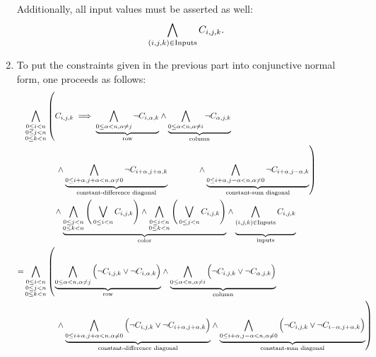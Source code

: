 \documentclass[journal,onecolumn]{IEEEtran}
\begin{document}
\begin{enumerate}
	Additionally, all input values must be asserted as well:
	\[
	\bigwedge_{(i, j, k) \in \textnormal{Inputs}} C_{i, j, k}.
	\]
	\item To put the constraints given in the previous part into conjunctive normal form, one proceeds as follows:
	\begin{align*}
	&\bigwedge_{\substack{0 \le i < n \\ 0 \le j < n \\ 0 \le k < n}} \left(C_{i, j, k} \implies {\underbrace{\bigwedge_{0 \le \alpha < n, \alpha \ne j} \lnot C_{i, \alpha, k}}_{\textnormal{row}}} \land {\underbrace{\bigwedge_{0 \le \alpha < n, \alpha \ne i} \lnot C_{\alpha, j, k}}_{\textnormal{column}}}\right. \\
	&\left. \qquad \qquad \! \! {} \land {\underbrace{\bigwedge_{0 \le i+\alpha, j+\alpha < n, \alpha \ne 0} \lnot C_{i+\alpha, j+\alpha, k}}_{\textnormal{constant-difference diagonal}}}  \qquad \qquad \! \! {} \land {\underbrace{\bigwedge_{0 \le i+\alpha, j-\alpha < n, \alpha \ne 0} \lnot C_{i+\alpha, j-\alpha, k}}_{\textnormal{constant-sum diagonal}}}\right) \\
	&\qquad \qquad \! \! {}  \land {\underbrace{\bigwedge_{\substack{0 \le j < n \\ 0 \le k < n}} \Bigg(\bigvee_{0 \le i < n} C_{i, j, k}\Bigg) \land \bigwedge_{\substack{0 \le i < n \\ 0 \le k < n}} \Bigg(\bigvee_{0 \le j < n} C_{i, j, k}\Bigg)}_{\textnormal{color}}} \land {\underbrace{\bigwedge_{(i, j, k) \in \textnormal{Inputs}} C_{i, j, k} \vphantom{\bigwedge_{\substack{0 \le j < n \\ 0 \le k < n}}}}_{\textnormal{inputs}}} \\
	=&\bigwedge_{\substack{0 \le i < n \\ 0 \le j < n \\ 0 \le k < n}} \left({\underbrace{\bigwedge_{0 \le \alpha < n, \alpha \ne j} \Big(\lnot C_{i, j, k} \lor \lnot C_{i, \alpha, k} \Big)}_{\textnormal{row}}} \land {\underbrace{\bigwedge_{0 \le \alpha < n, \alpha \ne i} \Big(\lnot C_{i, j, k} \lor \lnot C_{\alpha, j, k}\Big)}_{\textnormal{column}}} \right.\\
	&\left. \qquad \qquad \! \! {}  \land {\underbrace{\bigwedge_{0 \le i+\alpha, j+\alpha < n, \alpha \ne 0} \Big( \lnot C_{i, j, k} \lor \lnot C_{i + \alpha, j+\alpha, k}\Big)}_{\textnormal{constant-difference diagonal}}} \land {\underbrace{\bigwedge_{0 \le i+\alpha, j-\alpha < n, \alpha \ne 0} \Big( \lnot C_{i, j, k} \lor \lnot C_{i-\alpha, j+\alpha, k} \Big)}_{\textnormal{constant-sum diagonal}}}\right)\\

\end{align*}
\end{enumerate}
\end{document}
